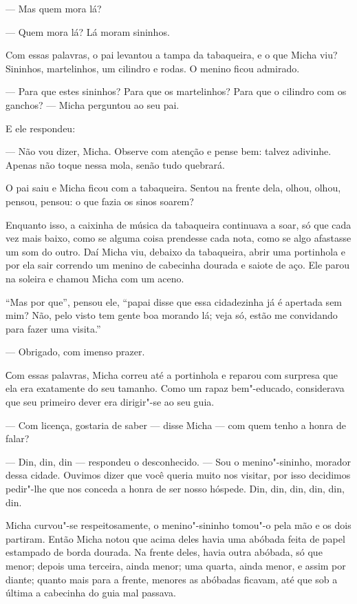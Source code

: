 --- Mas quem mora lá?

--- Quem mora lá? Lá moram sininhos.

Com essas palavras, o pai levantou a tampa da tabaqueira, e o que Micha
viu? Sininhos, martelinhos, um cilindro e rodas. O menino ficou admirado.

--- Para que estes sininhos? Para que os martelinhos? Para que o
cilindro com os ganchos? --- Micha perguntou ao seu pai.

E ele respondeu:

--- Não vou dizer, Micha. Observe com atenção e pense bem: talvez
adivinhe. Apenas não toque nessa mola, senão tudo quebrará.

O pai saiu e Micha ficou com a tabaqueira. Sentou na frente dela, olhou,
olhou, pensou, pensou: o que fazia os sinos soarem?

Enquanto isso, a caixinha de música da tabaqueira continuava a soar, só
que cada vez mais baixo, como se alguma coisa prendesse cada nota, como
se algo afastasse um som do outro. Daí Micha viu, debaixo da tabaqueira,
abrir uma portinhola e por ela sair correndo um menino de cabecinha
dourada e saiote de aço. Ele parou na soleira e chamou Micha com um
aceno.

``Mas por que'', pensou ele, ``papai disse que essa cidadezinha já é
apertada sem mim? Não, pelo visto tem gente boa morando lá; veja só,
estão me convidando para fazer uma visita.''

--- Obrigado, com imenso prazer.

Сom essas palavras, Micha correu até a portinhola e reparou com surpresa
que ela era exatamente do seu tamanho. Como um rapaz bem"-educado,
considerava que seu primeiro dever era dirigir"-se ao seu guia.

--- Com licença, gostaria de saber --- disse Micha --- com quem tenho a
honra de falar?

--- Din, din, din --- respondeu o desconhecido. --- Sou o
menino"-sininho, morador dessa cidade. Ouvimos dizer que você queria
muito nos visitar, por isso decidimos pedir"-lhe que nos conceda a honra
de ser nosso hóspede. Din, din, din, din, din, din.

Micha curvou"-se respeitosamente, o menino"-sininho tomou"-o pela mão e os
dois partiram. Então Micha notou que acima deles havia uma abóbada feita
de papel estampado de borda dourada. Na frente deles, havia outra
abóbada, só que menor; depois uma terceira, ainda menor; uma quarta,
ainda menor, e assim por diante; quanto mais para a frente, menores as
abóbadas ficavam, até que sob a última a cabecinha do guia mal passava.

